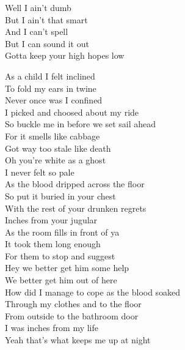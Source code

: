 


Well I ain't dumb \\
But I ain't that smart \\
And I can't spell \\
But I can sound it out \\

Gotta keep your high hopes low \\




As a child I felt inclined \\
To fold my ears in twine \\
Never once was I confined \\
I picked and choosed about my ride \\
So buckle me in before we set sail ahead \\
For it smells like cabbage \\
Got way too stale like death \\

Oh you're white as a ghost \\
I never felt so pale \\
As the blood dripped across the floor \\

So put it buried in your chest \\
With the rest of your drunken regrets \\
Inches from your jugular \\
As the room fills in front of ya \\
It took them long enough \\
For them to stop and suggest \\
Hey we better get him some help \\
We better get him out of here \\

How did I manage to cope as the blood soaked \\
Through my clothes and to the floor \\
From outside to the bathroom door \\
I was inches from my life \\
Yeah that's what keeps me up at night \\

